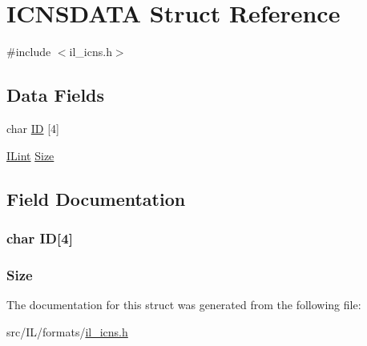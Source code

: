 \hypertarget{struct_i_c_n_s_d_a_t_a}{\section{I\-C\-N\-S\-D\-A\-T\-A Struct Reference}
\label{struct_i_c_n_s_d_a_t_a}
}


{\ttfamily \#include $<$il\-\_\-icns.\-h$>$}

\subsection*{Data Fields}
\begin{DoxyCompactItemize}
\item 
char \hyperlink{struct_i_c_n_s_d_a_t_a_aada70e832ece0fe35dca5b719e627466}{I\-D} \mbox{[}4\mbox{]}
\item 
\hyperlink{il_8h_a288a97fb9e92e707a60b749d0039fafe}{I\-Lint} \hyperlink{struct_i_c_n_s_d_a_t_a_a79baeeee1ab272b95715f56b698506c7}{Size}
\end{DoxyCompactItemize}


\subsection{Field Documentation}
\hypertarget{struct_i_c_n_s_d_a_t_a_aada70e832ece0fe35dca5b719e627466}{
\subsubsection[{I\-D}]{\setlength{\rightskip}{0pt plus 5cm}char I\-D\mbox{[}4\mbox{]}}}\label{struct_i_c_n_s_d_a_t_a_aada70e832ece0fe35dca5b719e627466}
\hypertarget{struct_i_c_n_s_d_a_t_a_a79baeeee1ab272b95715f56b698506c7}{
\subsubsection[{Size}]{ Size}}\label{struct_i_c_n_s_d_a_t_a_a79baeeee1ab272b95715f56b698506c7}


The documentation for this struct was generated from the following file\-:\begin{DoxyCompactItemize}
\item 
src/\-I\-L/formats/\hyperlink{il__icns_8h}{il\-\_\-icns.\-h}\end{DoxyCompactItemize}
